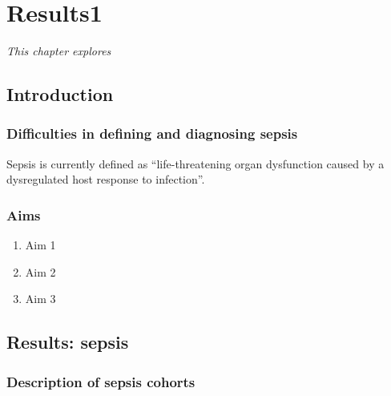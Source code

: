 \chapter{Results1}
\label{ch:Results1}
\textit{This chapter explores}

\startcontents[chapters]{\vspace{-1.4cm}}
\singlespacing
{}
\doublespacing

\section{Introduction}

\subsection{Difficulties in defining and diagnosing sepsis} \label{ssec:Sepsisdefinition}

Sepsis is currently defined as ``life-threatening organ dysfunction caused by a dysregulated host response to infection''. 

\subsection{Aims}

\begin{enumerate}
	\item Aim 1
	\item Aim 2
	\item Aim 3
\end{enumerate}

\section{Results: sepsis}

\subsection{Description of sepsis cohorts} \label{ssec:cohort_description}


